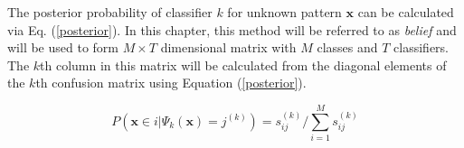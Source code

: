 The posterior probability of classifier $k$ for unknown pattern $\textbf{x}$ can be calculated via Eq. (\ref{posterior}). In this chapter, this method will be referred to as \textit{belief} and will be used to form $M \times T$ dimensional matrix with $M$ classes and $T$ classifiers. The $k$th column in this matrix will be calculated from the diagonal elements of the $k$th confusion matrix using Equation (\ref{posterior}).        

\begin{equation}
\label{posterior}
 P(\textbf{x}\in i\Big| \Psi_k(\textbf{x})=j^{(k)})= s^{(k)}_{ij} \bigg/{\mathop{\sum}\limits_{i=1}^{M} s^{(k)}_{ij} } 
\end{equation}
 
   

